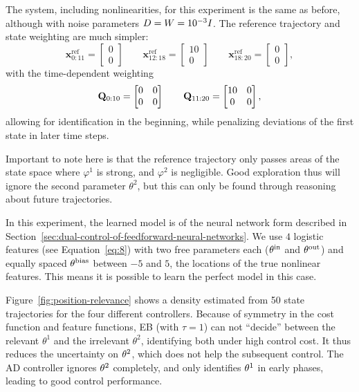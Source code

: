 The system, including nonlinearities, for this experiment is the same as before,
although with noise parameters $D = W = 10^{-3}I$. The reference
trajectory and state weighting are much simpler:
\begin{equation}
  \label{eq:exp3-trajectory}
  \mathbf{x}^\text{ref}_{0:11} = \begin{bmatrix} 0 \\ 0 \end{bmatrix}
  \qquad
  \mathbf{x}^\text{ref}_{12:18} = \begin{bmatrix} 10 \\ 0 \end{bmatrix}
  \qquad
  \mathbf{x}^\text{ref}_{18:20} = \begin{bmatrix} 0 \\ 0 \end{bmatrix},
\end{equation}
with the time-dependent weighting
\begin{equation}
  \mathbf{Q}_{0:10} = \begin{bmatrix} 0 & 0 \\ 0 & 0 \end{bmatrix}
  \qquad
  \mathbf{Q}_{11:20} = \begin{bmatrix} 10 & 0 \\ 0 & 0 \end{bmatrix},
\end{equation}
allowing for identification in the beginning, while penalizing deviations of
the first state in later time steps.

Important to note here is that the reference trajectory only passes areas of
the state space where $\varphi^1$ is strong, and $\varphi^2$ is negligible.
Good exploration thus will ignore the second parameter $\theta^2$, but this can
only be found through reasoning about future trajectories.

In this experiment, the learned model is of the neural network form described
in Section~\ref{sec:dual-control-of-feedforward-neural-networks}. We use $4$
logistic features (see Equation~\eqref{eq:8}) with two free parameters each
($\theta^\text{in}$ and $\theta^\text{out}$) and equally spaced $\theta^\text{bias}$
between $-5$ and $5$, the locations of the true nonlinear features. This means
it is possible to learn the perfect model in this case.

Figure~\ref{fig:position-relevance} shows a density estimated from 50 state
trajectories for the four different controllers. Because of symmetry in the
cost function and feature functions, EB (with $\tau=1$) can not ``decide''
between the relevant $\theta^1$ and the irrelevant $\theta^2$, identifying both
under high control cost. It thus reduces the uncertainty on $\theta^2$, which does
not help the subsequent control. The AD controller ignores $\theta^2$ completely,
and only identifies $\theta^1$ in early phases, leading to good control performance.

